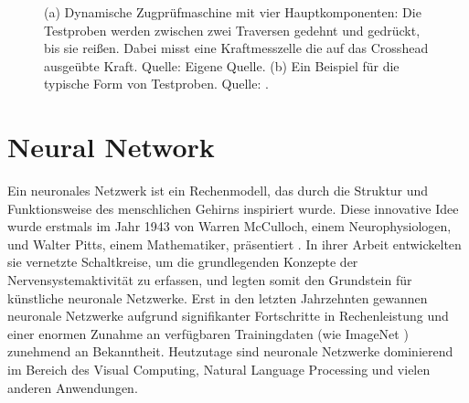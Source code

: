 \begin{figure}[htbp]
    \centering
 \caption[Dynamische Zugprüfmaschiene und Testproben]{(a) Dynamische Zugprüfmaschine mit vier Hauptkomponenten: Die Testproben werden zwischen zwei Traversen gedehnt und gedrückt, bis sie reißen. Dabei misst eine Kraftmesszelle die auf das Crosshead ausgeübte Kraft. Quelle: Eigene Quelle. (b) Ein Beispiel für die typische Form von Testproben. Quelle: \cite{specimens}.}
 \label{fig:background:DynamischeZugprüfmaschiene}
\end{figure}

\section{Neural Network}
Ein neuronales Netzwerk ist ein Rechenmodell, das durch die Struktur und Funktionsweise des menschlichen Gehirns inspiriert wurde. Diese innovative Idee wurde erstmals im Jahr 1943 von Warren McCulloch, einem Neurophysiologen, und Walter Pitts, einem Mathematiker, präsentiert \cite{McCullock1943}. In ihrer Arbeit entwickelten sie vernetzte Schaltkreise, um die grundlegenden Konzepte der Nervensystemaktivität zu erfassen, und legten somit den Grundstein für künstliche neuronale Netzwerke. Erst in den letzten Jahrzehnten gewannen neuronale Netzwerke aufgrund signifikanter Fortschritte in Rechenleistung und einer enormen Zunahme an verfügbaren Trainingdaten (wie ImageNet \cite{imagenet}) zunehmend an Bekanntheit. Heutzutage sind neuronale Netzwerke dominierend im Bereich des Visual Computing, Natural Language Processing und vielen anderen Anwendungen.

